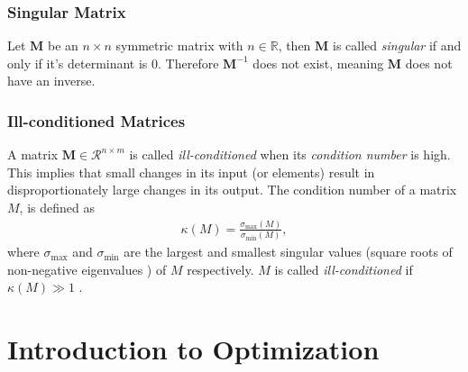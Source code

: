 \subsubsection{Singular Matrix }

Let $ \mathbf{M}$  be an $n \times n$ symmetric matrix with  $n \in \mathbb{R}$, then $ \mathbf{M}$ is called \emph{singular} if and only if it's determinant is $0$. Therefore $\mathbf{M}^{-1}$ does not exist, meaning $ \mathbf{M}$ does not have an inverse.\\ 
\subsubsection{Ill-conditioned Matrices}
A matrix $\mathbf{M} \in \mathcal{R}^{n\times m}$ is called \emph{ill-conditioned} when its \emph{condition number} is high.
This implies that small changes in its input (or elements) result in disproportionately large changes in its output.
The condition number of a matrix $M$, is defined as 
\begin{align}
    \kappa(M) = \frac{\sigma_{\max}(M)}{\sigma_{\min}(M)},
    \end{align}
where $\sigma_{\max}$ and $\sigma_{\min}$ are the largest and smallest singular values (square roots of non-negative eigenvalues \cite{SZABO2015320}) of $M$ respectively.
$M$ is called \emph{ill-conditioned} if $\kappa(M) \gg 1$
\cite{strang2022introduction}.
\section{Introduction to Optimization}
\label{sec:optimization}

